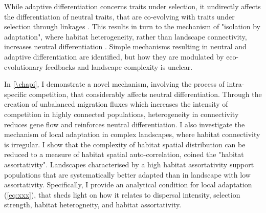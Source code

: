 % 
While adaptive differentiation concerns traits under selection, it undirectly affects the differentiation of neutral traits, that are co-evolving with traits under selection through linkages \citep{Billiard2015,Lepers2021}. This results in turn to the mechanism of "isolation by adaptation", where habitat heterogeneity, rather than landscape connectivity, increases neutral differentiation \citep{nosil2008}. 
% 
Simple mechanisms resulting in neutral and adaptive differentiation are identified, but how they are modulated by eco-evolutionary feedbacks and landscape complexity is unclear. %

In \cref{\chapi}, I demonstrate a novel mechanism, involving the process of intra-specific competition, that considerably affects neutral differentiation. Through the creation of unbalanced migration fluxes which increases the intensity of competition in highly connected populations, heterogeneity in connectivity reduces gene flow and reinforces neutral differentiation. %
% 
I also investigate the mechanism of local adaptation in complex landscapes, where habitat connectivity is irregular. I show that the complexity of habitat spatial distribution can be reduced to a measure of habitat spatial auto-correlation, coined the "habitat assortativity". Landscapes characterised by a high habitat assortativity support populations that are systematically better adapted than in landscape with low assortativity. Specifically, I provide an analytical condition for local adaptation  (\cref{eq:xxx}), that sheds light on how it relates to dispersal intensity, selection strength, habitat heterogneity, and habitat assortativity.

